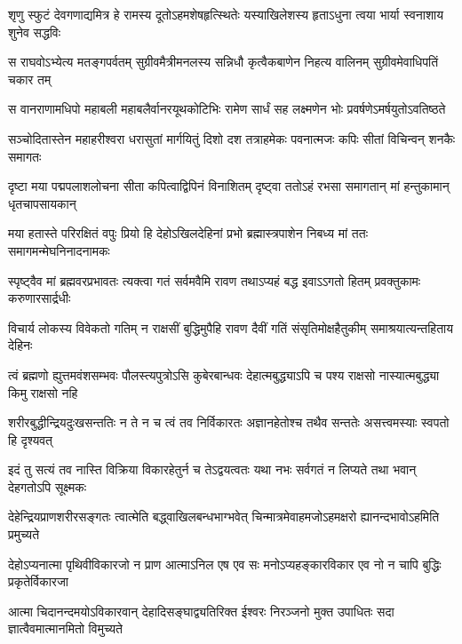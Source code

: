 \fourlineindentedshloka
{शृणु स्फुटं देवगणाद्यमित्र हे}
{रामस्य दूतोऽहमशेषहृत्स्थितेः}
{यस्याखिलेशस्य हृताऽधुना त्वया}
{भार्या स्वनाशाय शुनेव सद्धविः} %

\fourlineindentedshloka
{स राघवोऽभ्येत्य मतङ्गपर्वतम्}
{सुग्रीवमैत्रीमनलस्य सन्निधौ}
{कृत्वैकबाणेन निहत्य वालिनम्}
{सुग्रीवमेवाधिपतिं चकार तम्} %

\fourlineindentedshloka
{स वानराणामधिपो महाबली}
{महाबलैर्वानरयूथकोटिभिः}
{रामेण सार्धं सह लक्ष्मणेन भोः}
{प्रवर्षणेऽमर्षयुतोऽवतिष्ठते} %

\fourlineindentedshloka
{सञ्चोदितास्तेन महाहरीश्वरा}
{धरासुतां मार्गयितुं दिशो दश}
{तत्राहमेकः पवनात्मजः कपिः}
{सीतां विचिन्वन् शनकैः समागतः} %

\fourlineindentedshloka
{दृष्टा मया पद्मपलाशलोचना}
{सीता कपित्वाद्विपिनं विनाशितम्}
{दृष्ट्वा ततोऽहं रभसा समागतान्}
{मां हन्तुकामान् धृतचापसायकान्} %

\fourlineindentedshloka
{मया हतास्ते परिरक्षितं वपुः}
{प्रियो हि देहोऽखिलदेहिनां प्रभो}
{ब्रह्मास्त्रपाशेन निबध्य मां ततः}
{समागमन्मेघनिनादनामकः} %

\fourlineindentedshloka
{स्पृष्ट्वैव मां ब्रह्मवरप्रभावतः}
{त्यक्त्वा गतं सर्वमवैमि रावण}
{तथाऽप्यहं बद्ध इवाऽऽगतो हितम्}
{प्रवक्तुकामः करुणारसार्द्रधीः} %

\fourlineindentedshloka
{विचार्य लोकस्य विवेकतो गतिम्}
{न राक्षसीं बुद्धिमुपैहि रावण}
{दैवीं गतिं संसृतिमोक्षहैतुकीम्}
{समाश्रयात्यन्तहिताय देहिनः} %

\fourlineindentedshloka
{त्वं ब्रह्मणो ह्युत्तमवंशसम्भवः}
{पौलस्त्यपुत्रोऽसि कुबेरबान्धवः}
{देहात्मबुद्ध्याऽपि च पश्य राक्षसो}
{नास्यात्मबुद्ध्या किमु राक्षसो नहि} %

\fourlineindentedshloka
{शरीरबुद्धीन्द्रियदुःखसन्ततिः}
{न ते न च त्वं तव निर्विकारतः}
{अज्ञानहेतोश्च तथैव सन्ततेः}
{असत्त्वमस्याः स्वपतो हि दृश्यवत्} %

\fourlineindentedshloka
{इदं तु सत्यं तव नास्ति विक्रिया}
{विकारहेतुर्न च तेऽद्वयत्वतः}
{यथा नभः सर्वगतं न लिप्यते}
{तथा भवान् देहगतोऽपि सूक्ष्मकः}

\fourlineindentedshloka
{देहेन्द्रियप्राणशरीरसङ्गतः}
{त्वात्मेति बद्ध्वाखिलबन्धभाग्भवेत्} %
{चिन्मात्रमेवाहमजोऽहमक्षरो}
{ह्यानन्दभावोऽहमिति प्रमुच्यते}

\fourlineindentedshloka
{देहोऽप्यनात्मा पृथिवीविकारजो}
{न प्राण आत्माऽनिल एष एव सः} %
{मनोऽप्यहङ्कारविकार एव नो}
{न चापि बुद्धिः प्रकृतेर्विकारजा}

\fourlineindentedshloka
{आत्मा चिदानन्दमयोऽविकारवान्}
{देहादिसङ्घाद्व्यतिरिक्त ईश्वरः} %
{निरञ्जनो मुक्त उपाधितः सदा}
{ज्ञात्वैवमात्मानमितो विमुच्यते}

